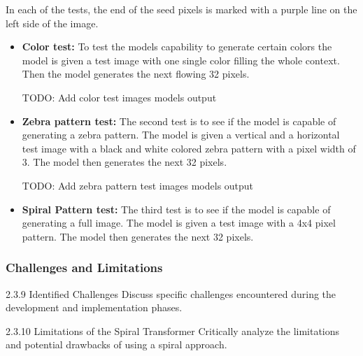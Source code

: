 In each of the tests, the end of the seed pixels is marked with a purple line on the left side of the image.

    \begin{itemize}
        \item \textbf{Color test:} To test the models capability to generate certain colors the model is given a test image with one single color filling the whole context. Then the model generates the next flowing 32 pixels. 
        
        TODO: Add color test images models output

        \item \textbf{Zebra pattern test:} The second test is to see if the model is capable of generating a zebra pattern. The model is given a vertical and a horizontal test image with a black and white colored zebra pattern with a pixel width of 3. The model then generates the next 32 pixels.
        
        TODO: Add zebra pattern test images models output

        \item \textbf{Spiral Pattern test:} The third test is to see if the model is capable of generating a full image. The model is given a test image with a 4x4 pixel pattern. The model then generates the next 32 pixels.
    \end{itemize}


\subsubsection{Challenges and Limitations}
2.3.9 Identified Challenges
Discuss specific challenges encountered during the development and implementation phases.

2.3.10 Limitations of the Spiral Transformer
Critically analyze the limitations and potential drawbacks of using a spiral approach.